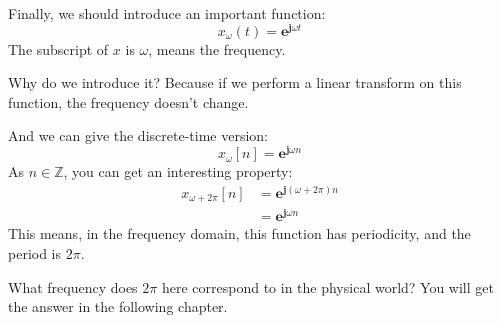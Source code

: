     Finally, we should introduce an important function:
        \begin{equation}
            x_{\omega}(t) = \mathbf{e}^{\mathbf{j}\omega t}
        \end{equation}
    The subscript of $x$ is $\omega$, means the frequency.

    Why do we introduce it? Because if we perform a linear transform on this function, the frequency doesn't change.
    
    And we can give the discrete-time version:
        \begin{equation}
            x_{\omega}[n] = \mathbf{e}^{\mathbf{j}\omega n}
        \end{equation}
    As $n \in \mathbb{Z}$, you can get an interesting property:
        \begin{equation}
            \begin{aligned}
            x_{\omega + 2\pi}[n] &= \mathbf{e}^{\mathbf{j}(\omega+2\pi) n}\\
                                 &= \mathbf{e}^{\mathbf{j}\omega n}
            \end{aligned}
        \end{equation}
    This means, in the frequency domain, this function has periodicity, 
    and the period is $2\pi$.

    What frequency does $2\pi$ here correspond to in the physical world? You will get the answer in the following chapter.


